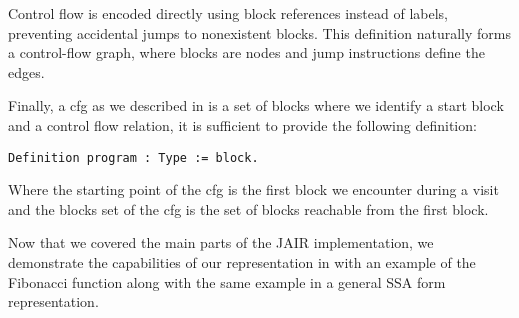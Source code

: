 Control flow is encoded directly using block references instead of labels, preventing accidental jumps to nonexistent blocks. This definition naturally forms a control-flow graph, where blocks are nodes and jump instructions define the edges.

Finally, a \gls{cfg} as we described in  is a set of blocks where we identify a start block and a control flow relation, it is sufficient to provide the following definition:

\begin{lstlisting}[style=Rocq]
Definition program : Type := block.
\end{lstlisting}

Where the starting point of the \gls{cfg} is the first block we encounter during a visit and the blocks set of the \gls{cfg} is the set of blocks reachable from the first block.

Now that we covered the main parts of the JAIR implementation, we demonstrate the capabilities of our representation in  with an example of the Fibonacci function along with the same example in a general SSA form representation.

